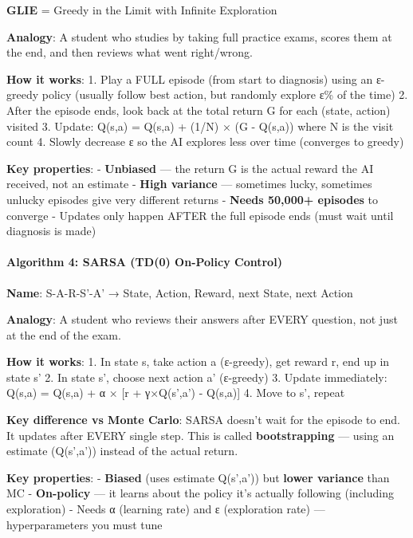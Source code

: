 \documentclass[
]{article}
\begin{document}
\textbf{GLIE} = Greedy in the Limit with Infinite Exploration

\textbf{Analogy}: A student who studies by taking full practice exams,
scores them at the end, and then reviews what went right/wrong.

\textbf{How it works}: 1. Play a FULL episode (from start to diagnosis)
using an ε-greedy policy (usually follow best action, but randomly
explore ε\% of the time) 2. After the episode ends, look back at the
total return G for each (state, action) visited 3. Update: Q(s,a) =
Q(s,a) + (1/N) × (G - Q(s,a)) where N is the visit count 4. Slowly
decrease ε so the AI explores less over time (converges to greedy)

\textbf{Key properties}: - \textbf{Unbiased} --- the return G is the
actual reward the AI received, not an estimate - \textbf{High variance}
--- sometimes lucky, sometimes unlucky episodes give very different
returns - \textbf{Needs 50,000+ episodes} to converge - Updates only
happen AFTER the full episode ends (must wait until diagnosis is made)

\hypertarget{algorithm-4-sarsa-td0-on-policy-control}{%
\paragraph{Algorithm 4: SARSA (TD(0) On-Policy
Control)}\label{algorithm-4-sarsa-td0-on-policy-control}}

\textbf{Name}: S-A-R-S'-A' → State, Action, Reward, next State, next
Action

\textbf{Analogy}: A student who reviews their answers after EVERY
question, not just at the end of the exam.

\textbf{How it works}: 1. In state s, take action a (ε-greedy), get
reward r, end up in state s' 2. In state s', choose next action a'
(ε-greedy) 3. Update immediately: Q(s,a) = Q(s,a) + α × {[}r +
γ×Q(s',a') - Q(s,a){]} 4. Move to s', repeat

\textbf{Key difference vs Monte Carlo}: SARSA doesn't wait for the
episode to end. It updates after EVERY single step. This is called
\textbf{bootstrapping} --- using an estimate (Q(s',a')) instead of the
actual return.

\textbf{Key properties}: - \textbf{Biased} (uses estimate Q(s',a')) but
\textbf{lower variance} than MC - \textbf{On-policy} --- it learns about
the policy it's actually following (including exploration) - Needs α
(learning rate) and ε (exploration rate) --- hyperparameters you must
tune
\end{document}
